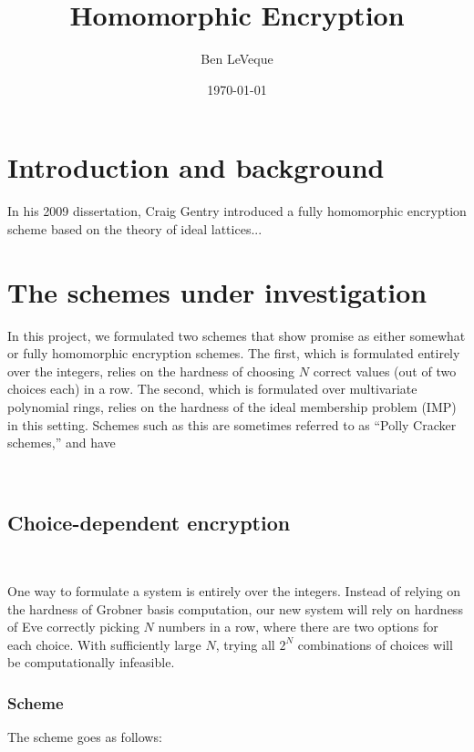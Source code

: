 \documentclass[11pt]{report}
\title{Homomorphic Encryption}
\author{Ben LeVeque}
\date{\today}
\begin{document}
\maketitle


\tableofcontents

\newpage

\section[Intro]{Introduction and background}
In his 2009 dissertation, Craig Gentry introduced a fully homomorphic encryption scheme based on the theory of ideal lattices...

\section[Schemes]{The schemes under investigation}

In this project, we formulated two schemes that show promise as either somewhat or fully homomorphic encryption schemes. The first,
which is formulated entirely over the integers, relies on the hardness of choosing $N$ correct values (out of two choices each) in a row.
The second, which is formulated over multivariate polynomial rings, relies on the hardness of the ideal membership problem (IMP) in this
setting. Schemes such as this are sometimes referred to as ``Polly Cracker schemes,'' and have 

\

\subsection{Choice-dependent encryption}

\

One way to formulate a system is entirely over the integers. Instead of relying on the hardness of Grobner basis computation, our new system will rely on hardness of Eve correctly picking $N$ numbers in a row, where there are two options for each choice. With sufficiently large $N$, trying all $2^N$ combinations of choices will be computationally infeasible.

\subsubsection{Scheme}

The scheme goes as follows:
\end{document}
